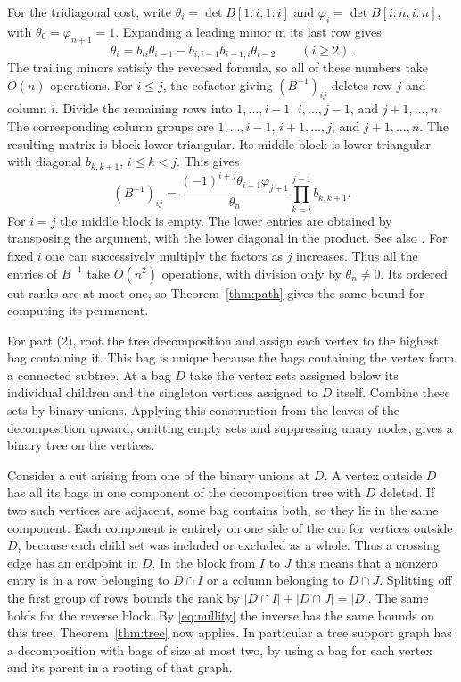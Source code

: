 \documentclass[11pt,reqno]{amsart}
\theoremstyle{remark}
\numberwithin{equation}{section}
\begin{document}
For the tridiagonal cost, write \(\theta_i=\det B[1:i,1:i]\) and
\(\varphi_i=\det B[i:n,i:n]\), with \(\theta_0=\varphi_{n+1}=1\).
Expanding a leading minor in its last row gives
\[
 \theta_i=b_{ii}\theta_{i-1}
          -b_{i,i-1}b_{i-1,i}\theta_{i-2}\qquad(i\ge2).
\]
The trailing minors satisfy the reversed formula, so all of these numbers
take \(O(n)\) operations. For \(i\leq j\), the cofactor giving
\((B^{-1})_{ij}\) deletes row \(j\) and column \(i\). Divide the
remaining rows into \(1,\ldots,i-1\), \(i,\ldots,j-1\), and
\(j+1,\ldots,n\). The corresponding column groups are \(1,\ldots,i-1\),
\(i+1,\ldots,j\), and \(j+1,\ldots,n\). The resulting matrix is block
lower triangular. Its middle block is lower triangular with diagonal
\(b_{k,k+1}\), \(i\le k<j\). This gives
\[
 (B^{-1})_{ij}
  =\frac{(-1)^{i+j}\theta_{i-1}\varphi_{j+1}}{\theta_n}
                     \prod_{k=i}^{j-1}b_{k,k+1}.
\]
For \(i=j\) the middle block is empty. The lower entries are obtained by
transposing the argument, with the lower diagonal in the product. See
also \cite{Usmani}. For fixed \(i\) one can successively multiply the
factors as \(j\) increases. Thus all the entries of \(B^{-1}\) take
\(O(n^2)\) operations, with division only by \(\theta_n\ne0\). Its
ordered cut ranks are at most one, so Theorem~\ref{thm:path} gives the
same bound for computing its permanent.

For part (2), root the tree decomposition and assign each vertex to the
highest bag containing it. This bag is unique because the bags containing
the vertex form a connected subtree. At a bag \(D\) take the vertex sets
assigned below its individual children and the singleton vertices
assigned to \(D\) itself. Combine these sets by binary unions. Applying
this construction from the leaves of the decomposition upward, omitting
empty sets and suppressing unary nodes, gives a binary tree on the
vertices.

Consider a cut arising from one of the binary unions at \(D\). A vertex
outside \(D\) has all its bags in one component of the decomposition tree
with \(D\) deleted. If two such vertices are adjacent, some bag contains
both, so they lie in the same component. Each component is entirely on
one side of the cut for vertices outside \(D\), because each child set
was included or excluded as a whole. Thus a crossing edge has an endpoint
in \(D\). In the block from \(I\) to \(J\) this means that a nonzero
entry is in a row belonging to \(D\cap I\) or a column belonging to
\(D\cap J\). Splitting off the first group of rows bounds the rank by
\(|D\cap I|+|D\cap J|=|D|\). The same holds for the reverse block. By
\eqref{eq:nullity} the inverse has the same bounds on this tree.
Theorem~\ref{thm:tree} now applies. In particular a tree support graph
has a decomposition with bags of size at most two, by using a bag for
each vertex and its parent in a rooting of that graph.
\end{document}
